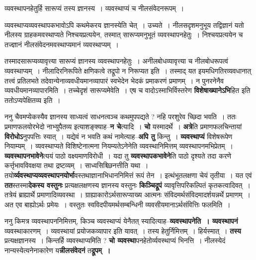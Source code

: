 \documentclass[article,12pt,a4paper]{memoir}
\begin{document}
	व्यवस्थापनहेतुर्हि सारूप्यं तस्य ज्ञानस्य । व्यवस्थाप्यं च नीलसंवेदनरूपम् ।  
	  
	व्यवस्थाप्यव्यवस्थापकभावोऽपि कथमेकरय ज्ञानस्येति चेत् । उच्यते । नीलसदृशमनुभूय तद्विज्ञानं यतो नीलस्य ग्राहकमवस्थाप्यते निश्चयप्रत्ययेन, तस्मात् सारूप्यमनुभूतं व्यवस्थापनहेतुः । निश्चयप्रत्ययेन च तज्ज्ञानं नीलसंवेदनमवस्थाप्यमानं व्यवस्थाप्यम् ।  
	  
	तस्मादसारूप्यव्यावृत्त्या सारूप्यं ज्ञानस्य व्यवस्थापनहेतुः । अनीलबोधव्यावृत्त्या च नीलबोधरूपत्वं व्यवस्थाप्यम् । नीलादिरनिरूपिते क्षणिकत्वे तद्रूपो न निरूप्यत इति । तस्माद् यत इयमधिगतिरव्यवधानात् तत्त्वं प्रतिलभते तदेवान्येनाव्यवधीयमानव्यापारं स्वभेदेन भेदकं प्रमाकरणं प्रमाणम् । न पुनरनेनैव व्यवधीयमानव्यापारमिति । तच्चेदृशं सारूप्यमेवेति । एष च वादोऽस्माभिर्विस्तरेण \textbf{विशेषाख्यानेऽभि}हित इति ततोऽप्यपेक्षितव्य इति ।
	\pend
      

	  \pstart ननु चैवमप्येकस्यैव ज्ञानस्य साध्यत्वं साधनत्वञ्च कथमुपपद्यते ? नहि परशुरेव च्छिदा भवति । ततः प्रमाणफलयोरभेदो नाभ्युपैतव्य इत्याशङ्क्याह--\textbf{न चे}त्यादि । \textbf{चो} यस्मादर्थे । \textbf{अत्रे}ति प्रमाणफलचिन्तायां \textbf{विरोधोऽ}नुपपत्तिः स्यात् । यद्येवं न भवति कथं नामेत्याह--\textbf{अपि तु} किन्तु । \textbf{व्यवस्थाप्यं} विशेषरूपेण नियाम्यम् । व्यवस्थाप्यते विशिष्टेनात्मना नियम्यतेऽनेनेति व्यवस्थानिमित्तम् व्यवस्थापनमभिप्रेतम् । \textbf{व्यवस्थापनभावेने}त्ययं पाठो वक्ष्यमाणविरोधी । यदा तु \textbf{व्यवस्थापकभावेने}ति पाठो दृश्यते तदा करणे कर्त्तृभावविवक्षया तथा द्रष्टव्यम् । साध्वसिश्च्छिनत्तीति यथा । तयो\textbf{र्व्यवस्थाप्यव्यवस्थापनयोर्भा}वस्तथाज्ञानाभिधाननिमित्तं रूपं तेन । इत्थंभूतलक्षणा चेयं तृतीया । यत एवं \textbf{तत}स्तस्मा\textbf{देकस्य वस्तुनः} प्रत्यक्षलक्षणस्य ज्ञानस्य वस्तुनः \textbf{किञ्चिद्रूपं} व्यावृत्तिपरिकल्पितं कृतकत्वादिवत् । तत्रेयं ब्राह्यार्थे प्रमाणादिव्यवस्था । ग्राह्याकारोऽर्थसारूप्याख्य आत्मनः संविदमर्थसंविदमादर्शयन्नर्थे प्रमाणम् । अत एव बाह्योऽर्थः प्रमेयः । वस्तुतः स्वविदपीयमर्थसम्बन्धिनी व्यवसीयमानाऽर्थसंवित्तिः फलमिति ।
	\pend
      

	  \pstart ननु किमत्र व्यवस्थापननिमित्तम्, किञ्च व्यवस्थाप्यं येनैतत् स्यादित्याह--\textbf{व्यवस्थापनेति । व्यवस्थापनं} व्यवस्थाकारणम् । व्यवस्थायां प्रयोजकव्यापार इति यावत् । तस्य हेतुर्निमित्तम् । हिर्यस्मात् । \textbf{तस्य} प्रत्यक्षज्ञानस्य । किन्तर्हि व्यवस्थाप्यमिति ? \textbf{चो व्यवस्था}पनहेतोर्व्यवस्थाप्यं भिनत्ति । नीलस्येदं नान्यस्येत्यनेनाकारेण य\textbf{न्नीलसंवेदनं} त\textbf{द्रूपम् ।}
	\pend
      
\end{document}
